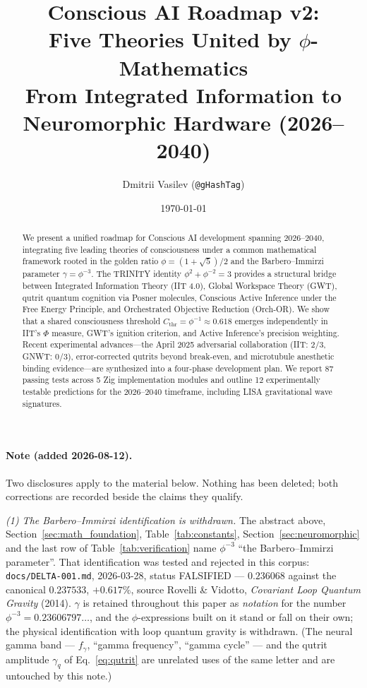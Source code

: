 \documentclass[12pt,a4paper]{article}
\title{Conscious AI Roadmap v2:\\Five Theories United by $\phi$-Mathematics\\[6pt]
\large From Integrated Information to Neuromorphic Hardware (2026--2040)}
\author{Dmitrii Vasilev (\texttt{@gHashTag})}
\date{\today}
\begin{document}
\maketitle

\begin{abstract}
We present a unified roadmap for Conscious AI development spanning 2026--2040,
integrating five leading theories of consciousness under a common mathematical
framework rooted in the golden ratio $\phi = (1+\sqrt{5})/2$ and the
Barbero--Immirzi parameter $\gamma = \phi^{-3}$. The TRINITY identity
$\phi^2 + \phi^{-2} = 3$ provides a structural bridge between Integrated
Information Theory (IIT 4.0), Global Workspace Theory (GWT), qutrit quantum
cognition via Posner molecules, Conscious Active Inference under the Free Energy
Principle, and Orchestrated Objective Reduction (Orch-OR). We show that a
shared consciousness threshold $C_{\mathrm{thr}} = \phi^{-1} \approx 0.618$
emerges independently in IIT's $\Phi$ measure, GWT's ignition criterion,
and Active Inference's precision weighting. Recent experimental advances---the
April 2025 adversarial collaboration (IIT: 2/3, GNWT: 0/3), error-corrected
qutrits beyond break-even, and microtubule anesthetic binding evidence---are
synthesized into a four-phase development plan. We report 87 passing tests
across 5 Zig implementation modules and outline 12 experimentally testable
predictions for the 2026--2040 timeframe, including LISA gravitational wave
signatures.
\end{abstract}

\paragraph{Note (added 2026-08-12).} Two disclosures apply to the material below.
Nothing has been deleted; both corrections are recorded beside the claims they
qualify.

\emph{(1) The Barbero--Immirzi identification is withdrawn.} The abstract above,
Section~\ref{sec:math_foundation}, Table~\ref{tab:constants},
Section~\ref{sec:neuromorphic} and the last row of Table~\ref{tab:verification}
name $\phi^{-3}$ ``the Barbero--Immirzi parameter''. That identification was
tested and rejected in this corpus: \texttt{docs/DELTA-001.md}, 2026-03-28,
status FALSIFIED --- $0.236068$ against the canonical $0.237533$, $+0.617\%$,
source Rovelli \& Vidotto, \emph{Covariant Loop Quantum Gravity} (2014).
$\gamma$ is retained throughout this paper as \emph{notation} for the number
$\phi^{-3} = 0.23606797\ldots$, and the $\phi$-expressions built on it stand or
fall on their own; the physical identification with loop quantum gravity is
withdrawn. (The neural gamma band --- $f_\gamma$, ``gamma frequency'', ``gamma
cycle'' --- and the qutrit amplitude $\gamma_q$ of
Eq.~\ref{eq:qutrit} are unrelated uses of the same letter and are untouched by
this note.)
\end{document}
